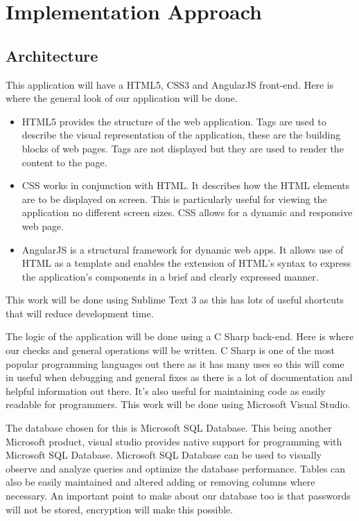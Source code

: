 \chapter{Implementation Approach}
\label{chap:implementation}

\section{Architecture} \label{sec:Arch}
This application will have a HTML5, CSS3 and AngularJS front-end. Here is where the general look of our application will be done.
\begin{itemize}
    \item HTML5 provides the structure of the web application. Tags are used to describe the visual representation of the application, these are the building blocks of web pages. Tags are not displayed but they are used to render the content to the page. 
    \item CSS works in conjunction with HTML. It describes how the HTML elements are to be displayed on screen. This is particularly useful for viewing the application no different screen sizes. CSS allows for a dynamic and responsive web page. 
    \item AngularJS is a structural framework for dynamic web apps. It allows use of HTML as a template and enables the extension of HTML's syntax to express the application's components in a brief and clearly expressed manner.
\end{itemize}
This work will be done using Sublime Text 3 as this has lots of useful shortcuts that will reduce development time. 

The logic of the application will be done using a C Sharp back-end. Here is where our checks and general operations will be written. C Sharp is one of the most popular programming languages out there as it has many uses so this will come in useful when debugging and general fixes as there is a lot of documentation and helpful information out there. It's also useful for maintaining code as easily readable for programmers. This work will be done using Microsoft Visual Studio. 

The database chosen for this is Microsoft SQL Database. This being another Microsoft product, visual studio provides native support for programming with Microsoft SQL Database. Microsoft SQL Database can be used to visually observe and analyze queries and optimize the database performance. Tables can also be easily maintained and altered adding or removing columns where necessary. An important point to make about our database too is that passwords will not be stored, encryption will make this possible.

